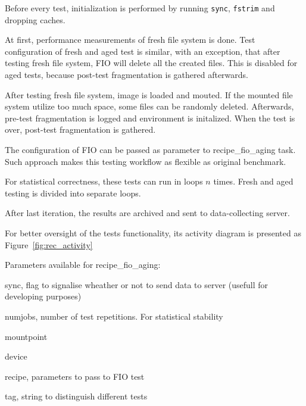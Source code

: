 \documentclass[
  color, %
  table, %
  lof,   %
  lot,   %
]{fithesis3}
\begin{document}
Before every test, initialization is performed by running \texttt{sync}, \texttt{fstrim} and dropping caches.

At first, performance measurements of fresh file system is done. Test configuration of fresh and aged test is similar, with an exception, that after testing fresh file system, FIO will delete all the created files. This is disabled for aged tests, because post-test fragmentation is gathered afterwards.

After testing fresh file system, image is loaded and mouted. If the mounted file system utilize too much space, some files can be randomly deleted. Afterwards, pre-test fragmentation is logged and environment is initalized. When the test is over, post-test fragmentation is gathered.

The configuration of FIO can be passed as parameter to recipe\_fio\_aging task. Such approach makes this testing workflow as flexible as original benchmark.

For statistical correctness, these tests can run in loops $n$ times. Fresh and aged testing is divided into separate loops.

After last iteration, the results are archived and sent to data-collecting server. 

For better oversight of the tests functionality, its activity diagram is presented as Figure~\ref{fig:rec_activity}

Parameters available for recipe\_fio\_aging:
\begin{compactenum}
  \item sync, flag to signalise wheather or not to send data to server (usefull for developing purposes)
  \item numjobs, number of test repetitions. For statistical stability
  \item mountpoint
  \item device
  \item recipe, parameters to pass to FIO test
  \item tag, string to distinguish different tests
  \end{compactenum}
\end{document}
